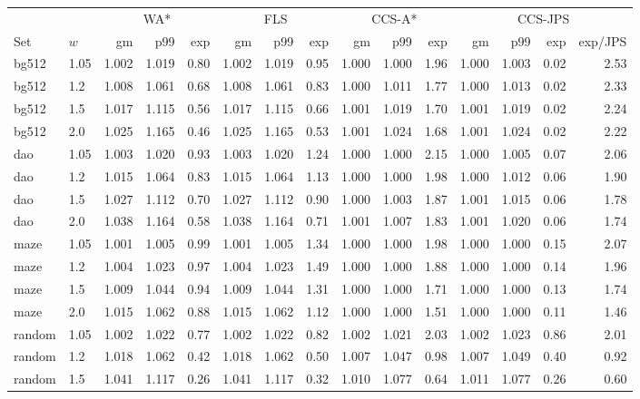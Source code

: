 \begin{tabular}{ll rrr rrr rrr rrrr}\toprule
 & & \multicolumn{3}{c}{WA*} & \multicolumn{3}{c}{FLS} & \multicolumn{3}{c}{CCS-A*} & \multicolumn{4}{c}{CCS-JPS}\\
Set & $w$ & gm & p99 & exp & gm & p99 & exp & gm & p99 & exp & gm & p99 & exp & exp/JPS\\\midrule
bg512 & 1.05 & 1.002 & 1.019 & 0.80 & 1.002 & 1.019 & 0.95 & 1.000 & 1.000 & 1.96 & 1.000 & 1.003 & 0.02 & 2.53\\
bg512 & 1.2 & 1.008 & 1.061 & 0.68 & 1.008 & 1.061 & 0.83 & 1.000 & 1.011 & 1.77 & 1.000 & 1.013 & 0.02 & 2.33\\
bg512 & 1.5 & 1.017 & 1.115 & 0.56 & 1.017 & 1.115 & 0.66 & 1.001 & 1.019 & 1.70 & 1.001 & 1.019 & 0.02 & 2.24\\
bg512 & 2.0 & 1.025 & 1.165 & 0.46 & 1.025 & 1.165 & 0.53 & 1.001 & 1.024 & 1.68 & 1.001 & 1.024 & 0.02 & 2.22\\
dao & 1.05 & 1.003 & 1.020 & 0.93 & 1.003 & 1.020 & 1.24 & 1.000 & 1.000 & 2.15 & 1.000 & 1.005 & 0.07 & 2.06\\
dao & 1.2 & 1.015 & 1.064 & 0.83 & 1.015 & 1.064 & 1.13 & 1.000 & 1.000 & 1.98 & 1.000 & 1.012 & 0.06 & 1.90\\
dao & 1.5 & 1.027 & 1.112 & 0.70 & 1.027 & 1.112 & 0.90 & 1.000 & 1.003 & 1.87 & 1.001 & 1.015 & 0.06 & 1.78\\
dao & 2.0 & 1.038 & 1.164 & 0.58 & 1.038 & 1.164 & 0.71 & 1.001 & 1.007 & 1.83 & 1.001 & 1.020 & 0.06 & 1.74\\
maze & 1.05 & 1.001 & 1.005 & 0.99 & 1.001 & 1.005 & 1.34 & 1.000 & 1.000 & 1.98 & 1.000 & 1.000 & 0.15 & 2.07\\
maze & 1.2 & 1.004 & 1.023 & 0.97 & 1.004 & 1.023 & 1.49 & 1.000 & 1.000 & 1.88 & 1.000 & 1.000 & 0.14 & 1.96\\
maze & 1.5 & 1.009 & 1.044 & 0.94 & 1.009 & 1.044 & 1.31 & 1.000 & 1.000 & 1.71 & 1.000 & 1.000 & 0.13 & 1.74\\
maze & 2.0 & 1.015 & 1.062 & 0.88 & 1.015 & 1.062 & 1.12 & 1.000 & 1.000 & 1.51 & 1.000 & 1.000 & 0.11 & 1.46\\
random & 1.05 & 1.002 & 1.022 & 0.77 & 1.002 & 1.022 & 0.82 & 1.002 & 1.021 & 2.03 & 1.002 & 1.023 & 0.86 & 2.01\\
random & 1.2 & 1.018 & 1.062 & 0.42 & 1.018 & 1.062 & 0.50 & 1.007 & 1.047 & 0.98 & 1.007 & 1.049 & 0.40 & 0.92\\
random & 1.5 & 1.041 & 1.117 & 0.26 & 1.041 & 1.117 & 0.32 & 1.010 & 1.077 & 0.64 & 1.011 & 1.077 & 0.26 & 0.60\\

\end{tabular}
